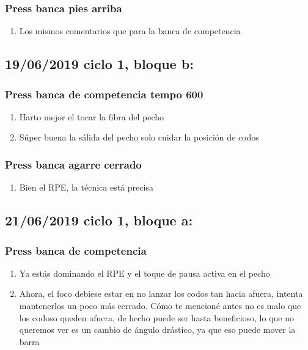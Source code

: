 \documentclass[11pt]{article}
\begin{document}
\subsubsection{Press banca pies arriba}
\label{sec:orgabcccd7}
\begin{enumerate}
\item Los mismos comentarios que para la banca de competencia
\end{enumerate}
\subsection{19/06/2019 ciclo 1, bloque b:}
\label{sec:orgbe22ed1}
\subsubsection{Press banca de competencia tempo 600}
\label{sec:org4c9cd22}
\begin{enumerate}
\item Harto mejor el tocar la fibra del pecho
\item Súper buena la sálida del pecho solo cuidar la posición de codos
\end{enumerate}
\subsubsection{Press banca agarre cerrado}
\label{sec:org29c1128}
\begin{enumerate}
\item Bien el RPE, la técnica está precisa
\end{enumerate}
\subsection{21/06/2019 ciclo 1, bloque a:}
\label{sec:org4503f17}
\subsubsection{Press banca de competencia}
\label{sec:orgde8886c}
\begin{enumerate}
\item Ya estás dominando el RPE y el toque de pausa activa en el pecho
\item Ahora, el foco debiese estar en no lanzar los codos tan hacia
afuera, intenta mantenerlos un poco más cerrado. Cómo te mencioné
antes no es malo que los codoso queden afuera, de hecho puede ser
hasta beneficioso, lo que no queremos ver es un cambio de ángulo
drástico, ya que eso puede mover la barra
\end{enumerate}
\end{document}
